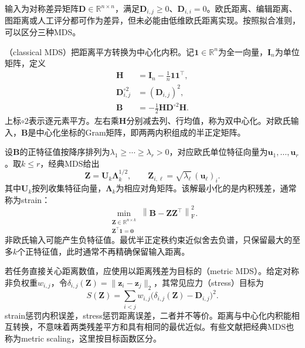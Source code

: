 输入为对称差异矩阵$\bm{D}\in\mathbb{R}^{n\times n}$，满足$\bm{D}_{i,j}\geq0$、$\bm{D}_{i,i}=0$。欧氏距离、编辑距离、图距离或人工评分都可作为差异，但未必能由低维欧氏距离实现。按照拟合准则，可以区分三种MDS。

（classical MDS）把距离平方转换为中心化内积。记$\bm{1}\in\mathbb{R}^n$为全一向量，$\bm{I}_n$为单位矩阵，定义
\begin{equation}
  \label{eq:dim-mds-centering}
  \begin{aligned}
    \bm{H}&=\bm{I}_n-\frac{1}{n}\bm{1}\bm{1}^{\top},\\
    \bm{D}^{\circ2}_{i,j}&=(\bm{D}_{i,j})^2,\\
    \bm{B}&=-\frac12\bm{H}\bm{D}^{\circ2}\bm{H}.
  \end{aligned}
\end{equation}
上标$\circ2$表示逐元素平方。左右乘$\bm{H}$分别减去列、行均值，称为双中心化。对欧氏输入，$\bm{B}$是中心化坐标的Gram矩阵，即两两内积组成的半正定矩阵。

设$\bm{B}$的正特征值按降序排列为$\lambda_1\geq\cdots\geq\lambda_r>0$，对应欧氏单位特征向量为$\bm{u}_1,\ldots,\bm{u}_r$。取$k\leq r$，经典MDS给出
\begin{equation}
  \label{eq:dim-mds-coordinates}
  \bm{Z}=\bm{U}_k\bm{\Lambda}_k^{1/2},
  \qquad
  \bm{Z}_{i,\ell}=\sqrt{\lambda_\ell}\,(\bm{u}_\ell)_i.
\end{equation}
其中$\bm{U}_k$按列收集特征向量，$\bm{\Lambda}_k$为相应对角矩阵。该解最小化的是内积残差，通常称为strain：
\begin{equation}
  \label{eq:dim-mds-strain}
  \min_{\substack{\bm{Z}\in\mathbb{R}^{n\times k}\\
                  \bm{Z}^{\top}\bm{1}=\bm{0}}}
  \left\lVert\bm{B}-\bm{Z}\bm{Z}^{\top}\right\rVert_{\mathrm{F}}^2.
\end{equation}
非欧氏输入可能产生负特征值。最优半正定秩约束近似舍去负谱，只保留最大的至多$k$个正特征值，此时通常不再精确保留输入距离。

若任务直接关心距离数值，应使用以距离残差为目标的（metric MDS）。给定对称非负权重$w_{i,j}$，令$\delta_{i,j}(\bm{Z})=\lVert\bm{z}_i-\bm{z}_j\rVert_2$，其常见应力（stress）目标为
\begin{equation}
  \label{eq:dim-mds-stress}
  S(\bm{Z})
  =\sum_{i<j}w_{i,j}
    \bigl(\delta_{i,j}(\bm{Z})-\bm{D}_{i,j}\bigr)^2.
\end{equation}
strain惩罚内积误差，stress惩罚距离误差，二者并不等价。距离与中心化内积能相互转换，不意味着两类残差平方和具有相同的最优近似。有些文献把经典MDS也称为metric scaling，这里按目标函数区分。

